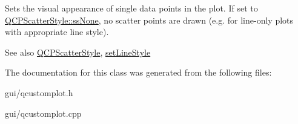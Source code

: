 Sets the visual appearance of single data points in the plot. If set to \hyperlink{classQCPScatterStyle_adb31525af6b680e6f1b7472e43859349abd144c291ca274f77053ec68cab6c022}{Q\+C\+P\+Scatter\+Style\+::ss\+None}, no scatter points are drawn (e.\+g. for line-\/only plots with appropriate line style).

\begin{DoxySeeAlso}{See also}
\hyperlink{classQCPScatterStyle}{Q\+C\+P\+Scatter\+Style}, \hyperlink{classQCPCurve_a4a377ec863ff81a1875c3094a6177c19}{set\+Line\+Style} 
\end{DoxySeeAlso}


The documentation for this class was generated from the following files\+:\begin{DoxyCompactItemize}
\item 
gui/qcustomplot.\+h\item 
gui/qcustomplot.\+cpp\end{DoxyCompactItemize}

